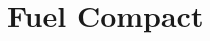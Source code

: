 \documentclass[11pt,letterpaper]{article}
\begin{document}

\section{Fuel Compact}




\pagebreak


\end{document}
